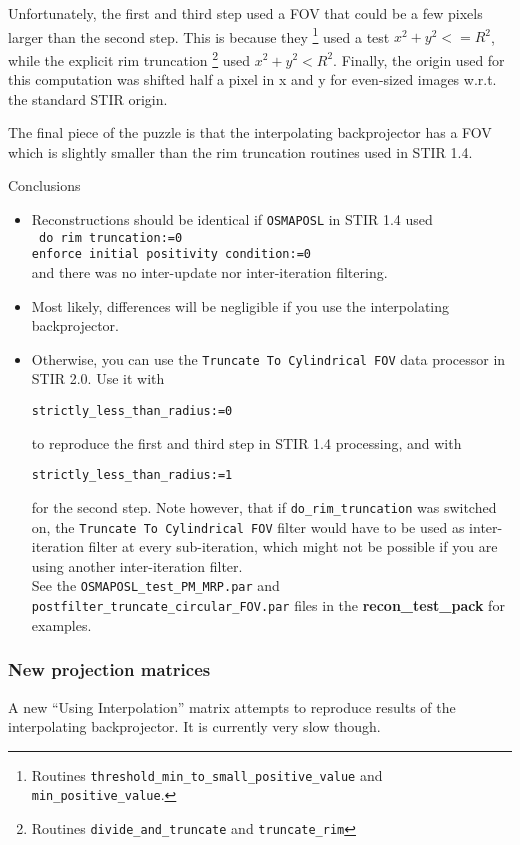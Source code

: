 \documentclass{article}
\begin{document}
Unfortunately, the first and third step used a FOV that could be
a few pixels larger than the second step. This is 
because they
\footnote{Routines \texttt{threshold\_min\_to\_small\_positive\_value}
and \texttt{min\_positive\_value}.}
 used a test $x^2+y^2 <= R^2$, while the explicit rim
truncation
\footnote{Routines \texttt{divide\_and\_truncate} and \texttt{truncate\_rim}}
 used $x^2+y^2 < R^2$.
Finally, the origin used for this computation was shifted half a pixel in 
x and y for even-sized images w.r.t. the standard STIR origin.

The final piece of the puzzle is that the interpolating backprojector has a 
FOV which is slightly smaller than the rim truncation routines used in 
STIR 1.4.

Conclusions
\begin{itemize}
\item Reconstructions should be identical if \texttt{OSMAPOSL} in 
STIR 1.4 used\\
\texttt{
do rim truncation:=0\\
enforce initial positivity condition:=0
}\\
and there was no inter-update nor inter-iteration filtering.

\item Most likely, differences will be negligible if you use the interpolating
backprojector.

\item Otherwise, you can use the \texttt{Truncate To Cylindrical FOV}
data processor in STIR 2.0. Use it with
\begin{verbatim}
strictly_less_than_radius:=0
\end{verbatim}
to reproduce the first and third step in STIR 1.4 processing, and with
\begin{verbatim}
strictly_less_than_radius:=1
\end{verbatim}
for the second step. Note however, that if
\texttt{do\_rim\_truncation} was switched on, the 
\texttt{Truncate To Cylindrical FOV} filter would have to be used
as inter-iteration filter at every sub-iteration, which might not be 
possible if you are using another inter-iteration filter.\\
See the \texttt{OSMAPOSL\_test\_PM\_MRP.par}
and \texttt{postfilter\_truncate\_circular\_FOV.par} files in the 
\textbf{recon\_test\_pack} for examples. 
\end{itemize}


\subsubsection{New projection matrices}
A new ``Using Interpolation'' matrix attempts to reproduce results of the interpolating 
backprojector. It is currently very slow though.
\end{document}

